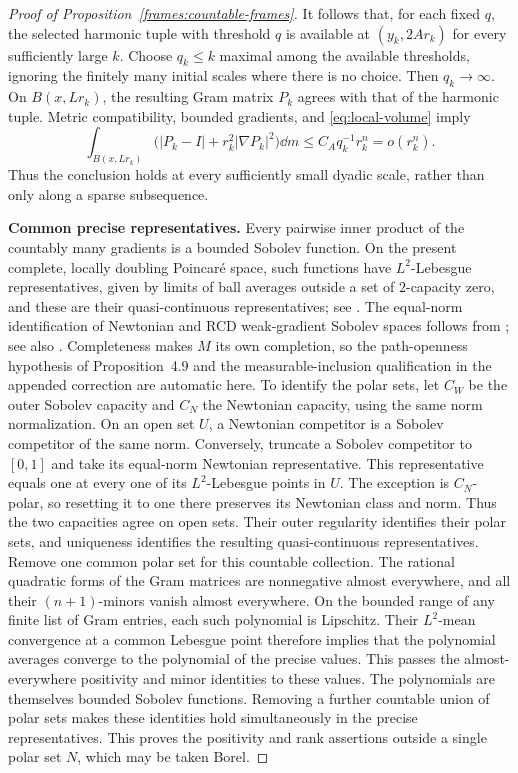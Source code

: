 \begin{proof}[Proof of Proposition~\ref{frames:countable-frames}]
 It follows that, for each fixed $q$, the selected harmonic tuple
 with threshold $q$ is available at $(y_k,2Ar_k)$ for every
 sufficiently large $k$.  Choose $q_k\leq k$ maximal among the
 available thresholds, ignoring the finitely many initial scales
 where there is no choice.  Then $q_k\to\infty$.
 On $B(x,Lr_k)$, the resulting Gram matrix $P_k$ agrees with that
 of the harmonic tuple.  Metric compatibility, bounded gradients,
 and \eqref{eq:local-volume} imply
 \begin{equation}\label{frames:all-dyadic-smallness}
  \int_{B(x,Lr_k)}
       \bigl(|P_k-I|+r_k^2|\nabla P_k|^2\bigr)\dd m
        \leq C_Aq_k^{-1}r_k^n=o(r_k^n).
 \end{equation}
 Thus the conclusion holds at every sufficiently small dyadic scale,
 rather than only along a sparse subsequence.

 \textbf{Common precise representatives.}
 Every pairwise inner product of the countably many gradients is a
 bounded Sobolev function.  On the present complete, locally doubling
 Poincar\'e space, such functions have $L^2$-Lebesgue representatives,
 given by limits of ball averages outside a set of $2$-capacity zero,
 and these are their quasi-continuous representatives; see
 \cite[Propositions~4.8--4.9]{BB2018}. The equal-norm identification
 of Newtonian and RCD weak-gradient Sobolev spaces follows from
 \cite[Theorem~7.4 and Section~8.2]{AGSWeakGradients2013}; see also
 \cite{Gigli2018}.
 Completeness makes $M$ its own completion, so the path-openness
 hypothesis of Proposition~4.9 and the measurable-inclusion
 qualification in the appended correction are automatic here.
 To identify the polar sets, let $C_W$ be the outer Sobolev capacity
 and $C_N$ the Newtonian capacity, using the same norm normalization.
 On an open set $U$, a Newtonian competitor is a Sobolev competitor
 of the same norm.  Conversely, truncate a Sobolev competitor to
 $[0,1]$ and take its equal-norm Newtonian representative.  This
 representative equals one at every one of its $L^2$-Lebesgue
 points in $U$.  The exception is $C_N$-polar, so resetting it to
 one there preserves its Newtonian class and norm.  Thus the two
 capacities agree on open sets.  Their outer regularity identifies
 their polar sets, and uniqueness identifies the resulting
 quasi-continuous representatives.
 Remove one common polar set for this countable collection.
 The rational quadratic forms of the Gram matrices are nonnegative
 almost everywhere, and all their $(n+1)$-minors vanish almost
 everywhere.  On the bounded range of any finite list of Gram
 entries, each such polynomial is Lipschitz.  Their $L^2$-mean
 convergence at a common Lebesgue point therefore implies that
 the polynomial averages converge to the polynomial of the
 precise values.  This passes the almost-everywhere positivity
 and minor identities to these values.  The polynomials are
 themselves bounded Sobolev functions.  Removing a
 further countable union of polar sets makes these identities hold
 simultaneously in the precise representatives.  This proves the
 positivity and rank assertions outside a single polar set $N$,
 which may be taken Borel.


\end{proof}
